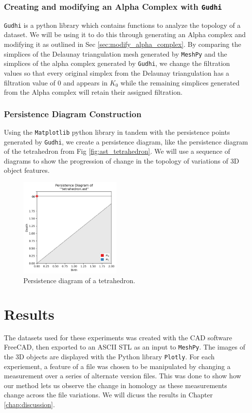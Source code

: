 \documentclass[ma]{uncgdissertationexp}
\theoremstyle{plain}
\theoremstyle{definition}
\theoremstyle{remark}
\begin{document}
\cprotect\subsection{Creating and modifying an Alpha Complex with \verb+Gudhi+}
\par \verb"Gudhi" is a python library which contains functions to analyze the topology of a dataset. We will be using it to do this through generating an Alpha complex and modifying it as outlined in Sec \ref{sec:modify_alpha_complex}. By comparing the simplices of the Delaunay triangulation mesh generated by \verb"MeshPy" and the simplices of the alpha complex generated by \verb"Gudhi", we change the filtration values so that every original simplex from the Delaunay triangulation has a filtration value of 0 and appears in $K_{0}$ while the remaining simplices generated from the Alpha complex will retain their assigned filtration.

\subsection{Persistence Diagram Construction}
\par Using the \verb"Matplotlib" python library in tandem with the persistence points generated by \verb"Gudhi", we create a persistence diagram, like the persistence diagram of the tetrahedron from Fig \ref{fig:ast_tetrahedron}. We will use a sequence of diagrams to show the progression of change in the topology of variations of 3D object features.
\begin{figure}[H]
    \begin{center}
	    \includegraphics[width=0.45\textwidth]{tetrahedron persdia.png}
    	\caption{Persistence diagram of a tetrahedron.}
    \end{center}
\end{figure}

\chapter{Results}
\par The datasets used for these experiments was created with the CAD software FreeCAD, then exported to an ASCII STL as an input to \verb"MeshPy". The images of the 3D objects are displayed with the Python library \verb"Plotly". For each experiement, a feature of a file was chosen to be manipulated by changing a measurement over a series of alternate version files. This was done to show how our method lets us observe the change in homology as these measurements change across the file variations. We will dicuss the results in Chapter \ref{chap:discussion}.
\end{document}
